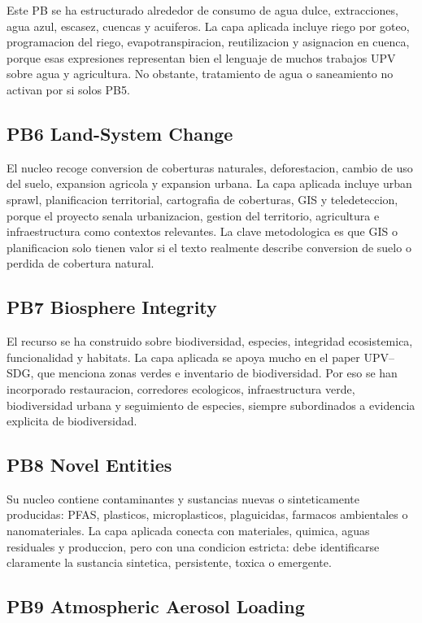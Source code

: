 \documentclass[11pt,a4paper]{article}
\begin{document}
Este PB se ha estructurado alrededor de consumo de agua dulce, extracciones, agua azul, escasez, cuencas y acuiferos. La capa aplicada incluye riego por goteo, programacion del riego, evapotranspiracion, reutilizacion y asignacion en cuenca, porque esas expresiones representan bien el lenguaje de muchos trabajos UPV sobre agua y agricultura. No obstante, tratamiento de agua o saneamiento no activan por si solos PB5.

\subsection{PB6 Land-System Change}

El nucleo recoge conversion de coberturas naturales, deforestacion, cambio de uso del suelo, expansion agricola y expansion urbana. La capa aplicada incluye urban sprawl, planificacion territorial, cartografia de coberturas, GIS y teledeteccion, porque el proyecto senala urbanizacion, gestion del territorio, agricultura e infraestructura como contextos relevantes. La clave metodologica es que GIS o planificacion solo tienen valor si el texto realmente describe conversion de suelo o perdida de cobertura natural.

\subsection{PB7 Biosphere Integrity}

El recurso se ha construido sobre biodiversidad, especies, integridad ecosistemica, funcionalidad y habitats. La capa aplicada se apoya mucho en el paper UPV--SDG, que menciona zonas verdes e inventario de biodiversidad. Por eso se han incorporado restauracion, corredores ecologicos, infraestructura verde, biodiversidad urbana y seguimiento de especies, siempre subordinados a evidencia explicita de biodiversidad.

\subsection{PB8 Novel Entities}

Su nucleo contiene contaminantes y sustancias nuevas o sinteticamente producidas: PFAS, plasticos, microplasticos, plaguicidas, farmacos ambientales o nanomateriales. La capa aplicada conecta con materiales, quimica, aguas residuales y produccion, pero con una condicion estricta: debe identificarse claramente la sustancia sintetica, persistente, toxica o emergente.

\subsection{PB9 Atmospheric Aerosol Loading}
\end{document}
